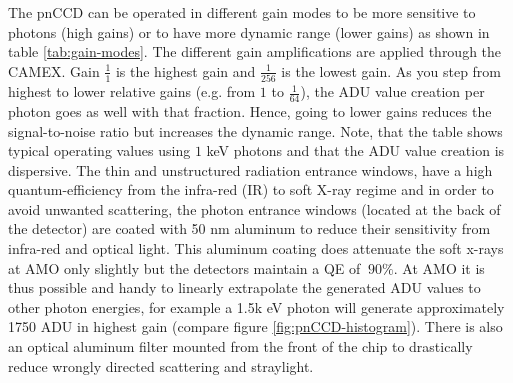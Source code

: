 The pnCCD can be operated in different gain modes to be more sensitive to photons (high gains) or to have more dynamic range (lower gains) as shown in table \ref{tab:gain-modes}. The different gain amplifications are applied through the CAMEX. Gain $\frac{1}{1}$ is the highest gain and $\frac{1}{256}$ is the lowest gain. As you step from highest to lower relative gains (e.g. from $1$ to $\frac{1}{64}$), the ADU value creation per photon goes as well with that fraction. Hence, going to lower gains reduces the signal-to-noise ratio but increases the dynamic range. Note, that the table shows typical operating values using $1$ keV photons and that the ADU value creation is dispersive. The thin and unstructured radiation entrance windows, have a high quantum-efficiency from the infra-red (IR) to soft X-ray regime and in order to avoid unwanted scattering, the photon entrance windows (located at the back of the detector) are coated with 50 nm aluminum to reduce their sensitivity from infra-red and optical light. This aluminum coating does attenuate the soft x-rays at AMO only slightly but the detectors maintain a QE of $~90\%$. At AMO it is thus possible and handy to linearly extrapolate the generated ADU values to other photon energies, for example a 1.5k eV photon will generate approximately 1750 ADU in highest gain (compare figure \ref{fig:pnCCD-histogram}). There is also an optical aluminum filter mounted from the front of the chip to drastically reduce wrongly directed scattering and straylight.
%
%
%

